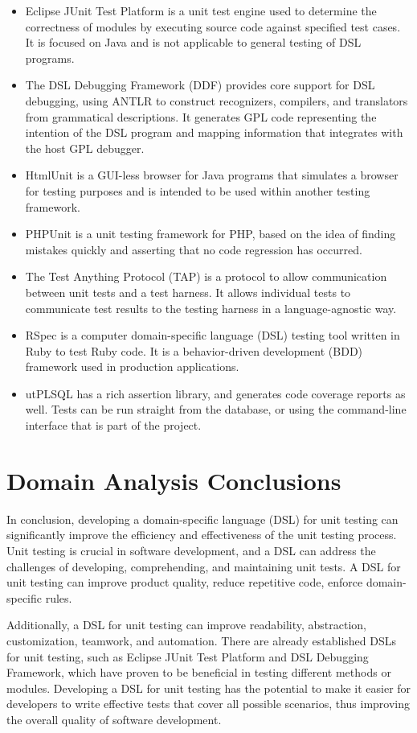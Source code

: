 \begin{itemize}
    \item Eclipse JUnit Test Platform is a unit test engine used to determine the correctness of modules by executing source code against specified test cases. It is focused on Java and is not applicable to general testing of DSL programs.
    \item The DSL Debugging Framework (DDF) provides core support for DSL debugging, using ANTLR to construct recognizers, compilers, and translators from grammatical descriptions. It generates GPL code representing the intention of the DSL program and mapping information that integrates with the host GPL debugger.
    \item HtmlUnit is a GUI-less browser for Java programs that simulates a browser for testing purposes and is intended to be used within another testing framework.
    \item PHPUnit is a unit testing framework for PHP, based on the idea of finding mistakes quickly and asserting that no code regression has occurred.
    \item The Test Anything Protocol (TAP) is a protocol to allow communication between unit tests and a test harness. It allows individual tests to communicate test results to the testing harness in a language-agnostic way. 
    \item RSpec is a computer domain-specific language (DSL) testing tool written in Ruby to test Ruby code. It is a behavior-driven development (BDD) framework used in production applications.
    \item utPLSQL has a rich assertion library, and generates code coverage reports as well. Tests can be run straight from the database, or using the command-line interface that is part of the project.

\end{itemize}


\section{Domain Analysis Conclusions}
In conclusion, developing a domain-specific language (DSL) for unit testing can significantly improve the efficiency and effectiveness of the unit testing process. Unit testing is crucial in software development, and a DSL can address the challenges of developing, comprehending, and maintaining unit tests. A DSL for unit testing can improve product quality, reduce repetitive code, enforce domain-specific rules.

Additionally, a DSL for unit testing can improve readability, abstraction, customization, teamwork, and automation. There are already established DSLs for unit testing, such as Eclipse JUnit Test Platform and DSL Debugging Framework, which have proven to be beneficial in testing different methods or modules. Developing a DSL for unit testing has the potential to make it easier for developers to write effective tests that cover all possible scenarios, thus improving the overall quality of software development.